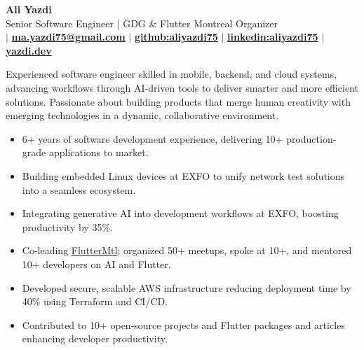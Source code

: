 \documentclass[letterpaper,11pt]{article}
\makeatletter
\newcommand{\CVAuthor}{Ali Yazdi}
\newcommand{\TitleDesciption}{Senior Software Engineer | GDG \& Flutter Montreal Organizer}
\newcommand{\CVWebpageName}{yazdi.dev}
\newcommand{\CVWebpage}{https://yazdi.dev}
\newcommand{\MainEmailName}{ma.yazdi75@gmail.com}
\newcommand{\MainEmail}{mailto:ma.yazdi75@gmail.com}
\newcommand{\LinkedinName}{linkedin:aliyazdi75}
\newcommand{\Linkedin}{https://linkedin.com/in/aliyazdi75}
\newcommand{\GithubName}{github:aliyazdi75}
\newcommand{\Github}{https://github.com/aliyazdi75}
\newcommand{\PhoneName}{}
\newcommand{\Phone}{}
\makeatother
\begin{document}

\begin{center}
      \textbf{\Huge \CVAuthor} \\
      \vspace{1mm}
      \TitleDesciption \\
      \small {\txtcolor\href{\Phone}{\textbf{\PhoneName}}}
      $\vert$
      {\txtcolor\href{\MainEmail}{\textbf{\MainEmailName}}}
      $\vert$
      {\txtcolor\href{\Github}{\textbf{\GithubName}}}
      $\vert$
      {\txtcolor\href{\Linkedin}{\textbf{\LinkedinName}}}
      $\vert$
      {\txtcolor\href{\CVWebpage}{\textbf{\CVWebpageName}}}
\end{center}



Experienced software engineer skilled in mobile, backend, and cloud systems, advancing workflows through AI-driven tools to deliver smarter and more efficient solutions.
Passionate about building products that merge human creativity with emerging technologies in a dynamic, collaborative environment.




\begin{itemize}[leftmargin=*, noitemsep, topsep=0pt, partopsep=0pt]
      \item 6+ years of software development experience, delivering 10+ production-grade applications to market.
      \item \BigGap Building embedded Linux devices at EXFO to unify network test solutions into a seamless ecosystem.
      \item \BigGap Integrating generative AI into development workflows at EXFO, boosting productivity by 35\%.
      \item \BigGap Co-leading \href{https://fluttermtl.dev}{FlutterMtl}; organized 50+ meetups, spoke at 10+, and mentored 10+ developers on AI and Flutter.
      \item \BigGap Developed secure, scalable AWS infrastructure reducing deployment time by 40\% using Terraform and CI/CD.
      \item \BigGap Contributed to 10+ open-source projects and Flutter packages and articles enhancing developer productivity.
\end{itemize}
\end{document}
